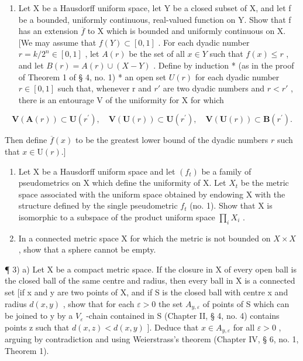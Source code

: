 \begin{enumerate}
\def\labelenumi{\arabic{enumi})}
\setcounter{enumi}{21}
\tightlist
\item
  Let X be a Hausdorff uniform space, let Y be a closed subset of X, and let f be a bounded, uniformly continuous, real-valued function on Y. Show that f has an extension \(\overline{f}\) to X which is bounded and uniformly continuous on X. {[}We may assume that \(f(Y) \subset [0, 1]\) . For each dyadic number \(r = k/2^{n} \in [0, 1]\) , let \(A(r)\) be the set of all \(x \in Y\) such that \(f(x) \leqslant r\) , and let \(B(r) = A(r) \cup (X - Y)\) . Define by induction * (as in the proof of Theorem 1 of § 4, no. 1) * an open set \(U(r)\) for each dyadic number \(r \in [0, 1]\) such that, whenever r and \(r'\) are two dyadic numbers and \(r < r'\) , there is an entourage V of the uniformity for X for which
\end{enumerate}

\[
\mathbf {V} (\mathbf {A} (r)) \subset \mathbf {U} (r ^ {\prime}), \quad \mathbf {V} (\mathbf {U} (r)) \subset \mathbf {U} (r ^ {\prime}), \quad \mathbf {V} (\mathbf {U} (r)) \subset \mathbf {B} (r ^ {\prime}).
\]

Then define \(\overline{f}(x)\) to be the greatest lower bound of the dyadic numbers \(r\) such that \(x \in \mathrm{U}(r).]\)

\ExerciseSection

\begin{enumerate}
\def\labelenumi{\arabic{enumi})}
\item
  Let X be a Hausdorff uniform space and let \((f_{t})\) be a family of pseudometrics on X which define the uniformity of X. Let \(X_{t}\) be the metric space associated with the uniform space obtained by endowing X with the structure defined by the single pseudometric \(f_{t}\) (no. 1). Show that X is isomorphic to a subspace of the product uniform space \(\prod_{i} X_{i}\) .
\item
  In a connected metric space X for which the metric is not bounded on \(X \times X\) , show that a sphere cannot be empty.
\end{enumerate}

¶ 3) a) Let X be a compact metric space. If the closure in X of every open ball is the closed ball of the same centre and radius, then every ball in X is a connected set {[}if x and y are two points of X, and if S is the closed ball with centre x and radius \(d(x, y)\) , show that for each \(\varepsilon > 0\) the set \(A_{y,\varepsilon}\) of points of S which can be joined to y by a \(V_{\varepsilon}\) -chain contained in S (Chapter II, § 4, no. 4) contains points z such that \(d(x, z) < d(x, y)\) {]}. Deduce that \(x \in A_{y,\varepsilon}\) for all \(\varepsilon > 0\) , arguing by contradiction and using Weierstrass's theorem (Chapter IV, § 6, no. 1, Theorem 1).

